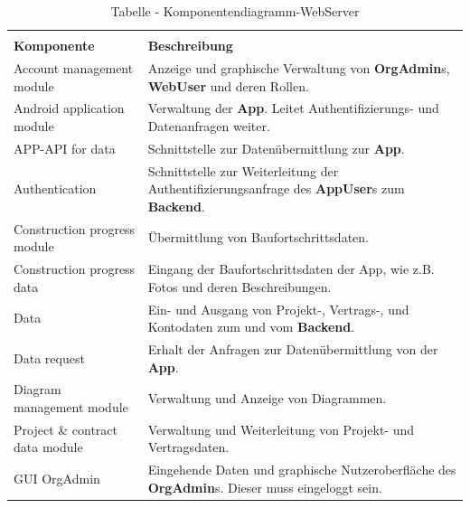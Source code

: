 \begin{longtable}[h]{p{4cm} p{10.0cm}}
	\caption{Tabelle - Komponentendiagramm-WebServer}
	\centering
	\label{tab:table_comp_webserver}
	\endlastfoot
	\multicolumn{2}{r}{{Weitergeführt auf der folgenden Seite}} \\
	\endfoot
	\endhead
	\rowcolor[HTML]{C0C0C0} 
	\textbf{Komponente} & \textbf{Beschreibung} \\
	
	Account management module & Anzeige und graphische Verwaltung von \textbf{OrgAdmin}s, \textbf{WebUser} und deren Rollen. \\
	
	\rowcolor[HTML]{E7E7E7} 
	Android application module & Verwaltung der \textbf{App}. Leitet Authentifizierungs- und Datenanfragen weiter. \\
	
	APP-API for data & Schnittstelle zur Datenübermittlung zur \textbf{App}. \\
	
	\rowcolor[HTML]{E7E7E7} 
	Authentication & Schnittstelle zur Weiterleitung der Authentifizierungsanfrage des \textbf{AppUser}s zum \textbf{Backend}. \\
	
	Construction progress module & Übermittlung von Baufortschrittsdaten. \\
	
	\rowcolor[HTML]{E7E7E7} 
	Construction progress data & Eingang der Baufortschrittsdaten der App, wie z.B. Fotos und deren Beschreibungen. \\
	
	Data & Ein- und Ausgang von Projekt-, Vertrags-, und Kontodaten zum und vom \textbf{Backend}. \\
	
	\rowcolor[HTML]{E7E7E7} 
	Data request & Erhalt der Anfragen zur Datenübermittlung von der \textbf{App}. \\
	
	Diagram management module & Verwaltung und Anzeige von Diagrammen. \\
	
	\rowcolor[HTML]{E7E7E7} 
	Project {\&} contract data module & Verwaltung und Weiterleitung von Projekt- und Vertragsdaten. \\
	
	GUI OrgAdmin & Eingehende Daten und graphische Nutzeroberfläche des \textbf{OrgAdmin}s. Dieser muss eingeloggt sein. \\
	

\end{longtable}
